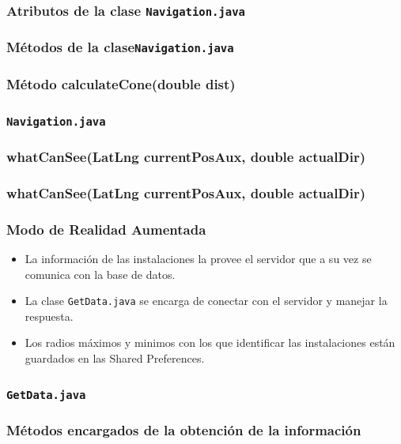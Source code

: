  
\begin{frame}
	\frametitle{Atributos de la clase \texttt{Navigation.java}}
	
\end{frame}

\begin{frame}
	\frametitle{Métodos de la clase\texttt{Navigation.java}}
	
\end{frame}

\begin{frame}
	\frametitle{Método calculateCone(double dist)}
	
\end{frame}
	  
\begin{frame}
	\frametitle{\texttt{Navigation.java}}
	
	
\end{frame}

     
\begin{frame}
	\frametitle{whatCanSee(LatLng currentPosAux, double actualDir)}
	
\end{frame}
\begin{frame}
	\frametitle{whatCanSee(LatLng currentPosAux, double actualDir)}
	
\end{frame}


\begin{frame}
	\frametitle{Modo de Realidad Aumentada}
			\begin{itemize}
				\item La información de las instalaciones la provee el servidor que a su vez se comunica con la base de datos.
				\item La clase \texttt{GetData.java} se encarga de conectar con el servidor y manejar la respuesta.
				\item Los radios máximos y minimos con los que identificar las instalaciones están guardados en las Shared Preferences.
			\end{itemize}
			\endblock{}
\end{frame}

\begin{frame}
	\frametitle{\texttt{GetData.java}}
	
\end{frame}

\begin{frame}
	\frametitle{Métodos encargados de la obtención de la información}
	
	
\end{frame}

